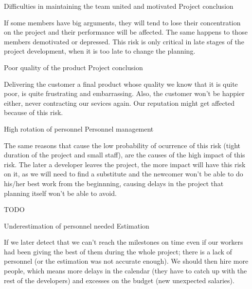 \begin{risk}[riskMotivation]{Difficulties in maintaining the team united and motivated}
\riskcat Project conclusion

If some members have big arguments, they will tend to lose their concentration on the project and their performance will be affected. The same happens to those members demotivated or depressed. This risk is only critical in late stages of the project development, when it is too late to change the planning.
\end{risk}

\begin{risk}[riskQuality]{Poor quality of the product}
\riskcat Project conclusion

Delivering the customer a final product whose quality we know that it is quite poor, is quite frustrating and embarrassing. Also, the customer won't be happier either, never contracting our sevices again. Our reputation might get affected because of this risk.
\end{risk}

\begin{risk}[riskPersonnelRotation]{High rotation of personnel}
\riskcat Personnel management

The same reasons that cause the low probability of ocurrence of this risk (tight duration of the project and small staff), are the causes of the high impact of this risk. The later a developer leaves the project, the more impact will have this risk on it, as we will need to find a substitute and the newcomer won't be able to do his/her best work from the beginnning, causing delays in the project that planning itself won't be able to avoid.
\end{risk}

TODO
\begin{risk}[riskPersonnelUnderestimation]{Underestimation of personnel needed}
\riskcat Estimation

If we later detect that we can't reach the milestones on time even if our workers had been giving the best of them during the whole project; there is a lack of personnel (or the estimation was not accurate enough). We should then hire more people, which means more delays in the calendar (they have to catch up with the rest of the developers) and excesses on the budget (new unexpected salaries).
\end{risk}


